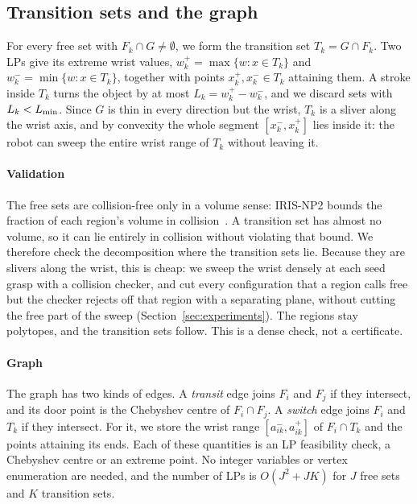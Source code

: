 \subsection{Transition sets and the graph}
\label{sec:method:graph}
For every free set with $F_k\cap G\ne\emptyset$, we form the transition set
$T_k=G\cap F_k$. Two LPs give its extreme wrist values,
$w_k^{+}=\max\{w:x\in T_k\}$ and $w_k^{-}=\min\{w:x\in T_k\}$, together with
points $x_k^{+},x_k^{-}\in T_k$ attaining them. A stroke inside $T_k$ turns the
object by at most $L_k=w_k^+-w_k^-$, and we discard sets with $L_k<L_{\min}$.
Since $G$ is thin in every direction but the wrist, $T_k$ is a sliver along the
wrist axis, and by convexity the whole segment $[x_k^-,x_k^+]$ lies inside it:
the robot can sweep the entire wrist range of $T_k$ without leaving it.

\paragraph{Validation} The free sets are collision-free only in a volume
sense: IRIS-NP2 bounds the fraction of each region's volume in
collision~\cite{werner2024faster}. A transition set has almost no volume, so it
can lie entirely in collision without violating that bound. We therefore check
the decomposition where the transition sets lie. Because they are slivers
along the wrist, this is cheap: we sweep the wrist densely at each seed grasp
with a collision checker, and cut every configuration that a region calls free
but the checker rejects off that region with a separating plane, without
cutting the free part of the sweep (Section~\ref{sec:experiments}). The regions
stay polytopes, and the transition sets follow. This is a dense check, not a
certificate.

\paragraph{Graph} The graph has two kinds of edges. A \emph{transit} edge
joins $F_i$ and $F_j$ if they intersect, and its door point is the Chebyshev
centre of $F_i\cap F_j$. A \emph{switch} edge joins $F_i$ and $T_k$ if they
intersect. For it, we store the wrist range $[a_{ik}^-,a_{ik}^+]$ of
$F_i\cap T_k$ and the points attaining its ends. Each of these quantities is
an LP feasibility check, a Chebyshev centre or an extreme point. No integer
variables or vertex enumeration are needed, and the number of LPs is
$O(J^2+JK)$ for $J$ free sets and $K$ transition sets.

